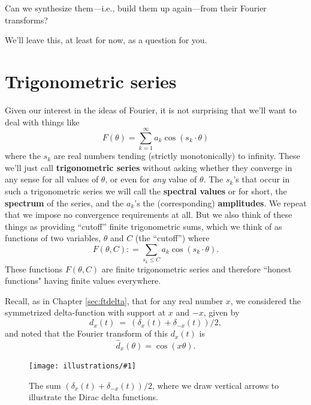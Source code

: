 \documentclass[openany]{book}
\newcommand{\ill}[3]{%
   \begin{figure}[H]%
   \vspace{-2ex}
   \centering%
   \texttt{[image: illustrations/\#1]}%
   \caption{#3}%
   \vspace{-2ex}
    \end{figure}}
\theoremstyle{plain}
\theoremstyle{definition}
\begin{document}
{Can we synthesize them---i.e., build them up again---from their Fourier transforms?


  We'll leave this, at least for now, as a question for you.




\chapter{Trigonometric series}\label{ch:trigseries}
Given our interest in the ideas of Fourier, it is not surprising that
we'll want to deal with things like $$F(\theta) = \sum_{k=1}^{\infty}
a_k\cos(s_k\cdot \theta)$$ where the $s_k$ are real numbers tending
(strictly monotonically) to infinity.  These we'll just call {\bf
  trigonometric series} without asking whether they converge in any
sense for all values of $\theta$, or even for {\it any} value of $\theta$. The
$s_k$'s that occur in such a trigonometric series we will call the
{\bf spectral values} or for short, the {\bf spectrum} of the series,
and the $a_k$'s the (corresponding) {\bf amplitudes}.  We repeat that
we impose no convergence requirements at all. But we also think of
these things as providing ``cutoff'' finite trigonometric sums, which
we think of as functions of two variables, $\theta$ and $C$ (the
``cutoff'') where $$F(\theta,C): = \sum_{s_k\le C} a_k\cos(s_k\cdot \theta).$$ These functions $F(\theta,C)$ are finite trigonometric series and therefore ``honest functions" having finite values everywhere.




Recall, as in Chapter \ref{sec:ftdelta}, that for any real number $x$, we considered
the symmetrized delta-function with support at $x$ and $-x$, given
by
$$
 d_x(t) \ = \ (\delta_x(t) + \delta_{-x}(t))/2,
$$
and noted that the Fourier transform of this $d_x(t)$  is
$$
   \label{dx2}{\hat d_x}(\theta)  = \cos(x\theta).
$$
\ill{two_delta}{0.4}{The sum $(\delta_x(t) + \delta_{-x}(t))/2$,
where we draw vertical arrows to illustrate the Dirac delta functions.}

}
\end{document}
